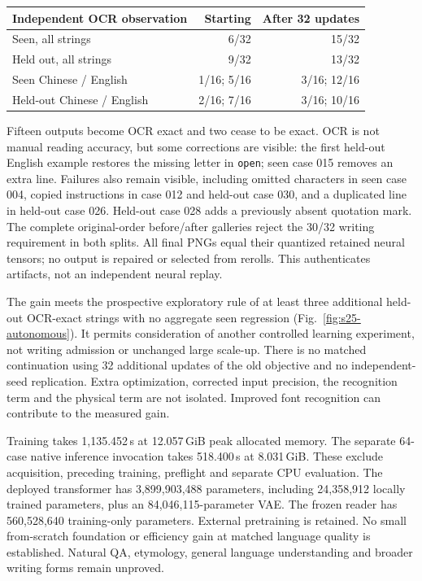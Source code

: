 \documentclass[10pt,a4paper]{article}
\begin{document}
\begin{center}\small
\begin{tabular}{lrr}
\toprule
Independent OCR observation & Starting & After 32 updates\\
\midrule
Seen, all strings & 6/32 & 15/32\\
Held out, all strings & 9/32 & 13/32\\
Seen Chinese / English & 1/16; 5/16 & 3/16; 12/16\\
Held-out Chinese / English & 2/16; 7/16 & 3/16; 10/16\\
\bottomrule
\end{tabular}
\end{center}

Fifteen outputs become OCR exact and two cease to be exact. OCR is not
manual reading accuracy, but some corrections are visible: the first
held-out English example restores the missing letter in \texttt{open}; seen
case 015 removes an extra line. Failures also remain visible, including
omitted characters in seen case 004, copied instructions in case 012 and
held-out case 030, and a duplicated line in held-out case 026. Held-out case
028 adds a previously absent quotation mark. The complete original-order
before/after galleries reject the 30/32 writing requirement in both splits.
All final PNGs equal their quantized retained neural tensors; no output is
repaired or selected from rerolls. This authenticates artifacts, not an
independent neural replay.

The gain meets the prospective exploratory rule of at least three additional
held-out OCR-exact strings with no aggregate seen regression
(Fig.~\ref{fig:s25-autonomous}). It permits consideration of another controlled
learning experiment, not writing admission or unchanged large scale-up.
There is no matched continuation using 32 additional updates of the old
objective and no independent-seed replication. Extra optimization, corrected
input precision, the recognition term and the physical term are not isolated.
Improved font recognition can contribute to the measured gain.

Training takes 1,135.452\,s at 12.057\,GiB peak allocated memory. The separate
64-case native inference invocation takes 518.400\,s at 8.031\,GiB. These
exclude acquisition, preceding training, preflight and separate CPU evaluation.
The deployed transformer has 3,899,903,488 parameters, including 24,358,912
locally trained parameters, plus an 84,046,115-parameter VAE. The frozen reader
has 560,528,640 training-only parameters. External pretraining is retained.
No small from-scratch foundation or efficiency gain at matched language
quality is established. Natural QA, etymology, general language understanding
and broader writing forms remain unproved.
\end{document}
